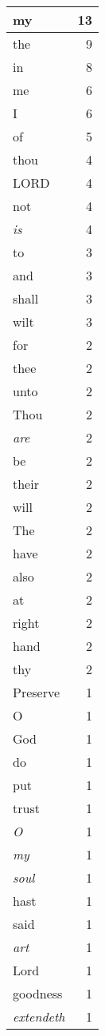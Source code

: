 \begin{center}
\begin{longtable}{l|r}
\hline \hline
\endlastfoot
my & 13 \\ \hline
the & 9 \\ \hline
in & 8 \\ \hline
me & 6 \\ \hline
I & 6 \\ \hline
of & 5 \\ \hline
thou & 4 \\ \hline
LORD & 4 \\ \hline
not & 4 \\ \hline
\emph{is} & 4 \\ \hline
to & 3 \\ \hline
and & 3 \\ \hline
shall & 3 \\ \hline
wilt & 3 \\ \hline
for & 2 \\ \hline
thee & 2 \\ \hline
unto & 2 \\ \hline
Thou & 2 \\ \hline
\emph{are} & 2 \\ \hline
be & 2 \\ \hline
their & 2 \\ \hline
will & 2 \\ \hline
The & 2 \\ \hline
have & 2 \\ \hline
also & 2 \\ \hline
at & 2 \\ \hline
right & 2 \\ \hline
hand & 2 \\ \hline
thy & 2 \\ \hline
Preserve & 1 \\ \hline
O & 1 \\ \hline
God & 1 \\ \hline
do & 1 \\ \hline
put & 1 \\ \hline
trust & 1 \\ \hline
\emph{O} & 1 \\ \hline
\emph{my} & 1 \\ \hline
\emph{soul} & 1 \\ \hline
hast & 1 \\ \hline
said & 1 \\ \hline
\emph{art} & 1 \\ \hline
Lord & 1 \\ \hline
goodness & 1 \\ \hline
\emph{extendeth} & 1 \\ \hline

\end{longtable}
\end{center}
